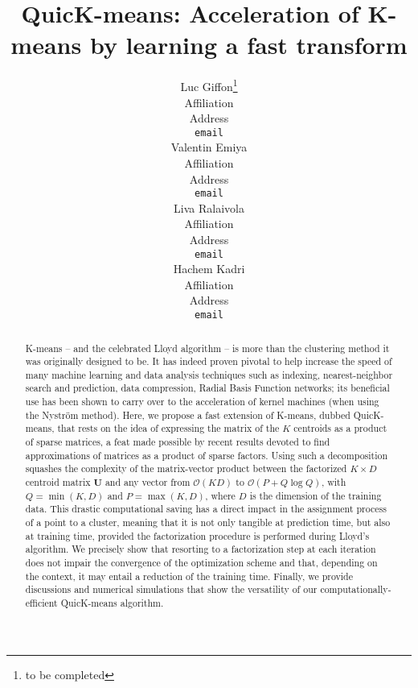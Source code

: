 \documentclass{article}
\title{QuicK-means: Acceleration of K-means by learning a fast transform}
\author{%
  Luc Giffon\thanks{to be completed} \\
  Affiliation\\
  Address\\
  \texttt{email} \\
   \And
   Valentin Emiya\\
  Affiliation\\
  Address\\
  \texttt{email} \\
   \And
   Liva Ralaivola\\
  Affiliation\\
  Address\\
  \texttt{email} \\
   \And
   Hachem Kadri\\
  Affiliation\\
  Address\\
  \texttt{email} \\
}
\begin{document}
\maketitle

\begin{abstract}
	
	K-means -- and the celebrated Lloyd algorithm -- is more than the clustering method it was originally designed to be. 
	It has indeed proven pivotal to help increase the speed of many machine learning and data analysis techniques such as indexing, nearest-neighbor search and prediction, data compression, Radial Basis Function networks; its beneficial use has been shown to carry over to the acceleration of kernel machines (when using the Nyström method). 
	Here, we propose a fast extension of K-means, dubbed QuicK-means, that rests on the idea of expressing the matrix of the $K$ centroids as a product of sparse matrices, a feat made possible by recent results devoted to find approximations of matrices as a product of sparse factors. Using such a decomposition squashes the complexity of the matrix-vector product between the factorized $K \times D$ centroid matrix $\mathbf{U}$ and any vector from $\mathcal{O}(KD)$ to $\mathcal{O}(P+Q \log Q)$, with $Q=\min (K, D)$ and $P=\max (K, D)$, where $D$ is the dimension of the training data. This drastic computational saving has a direct impact in the assignment process of a point to a cluster, meaning that it is not only tangible at prediction time, but also at training time, provided the factorization procedure is performed during Lloyd's algorithm. We precisely show that resorting to a factorization step at each iteration does not impair the convergence of the optimization scheme and that, depending on the context, it may entail a reduction of the training time. Finally, we provide discussions and numerical simulations that show the versatility of our computationally-efficient QuicK-means algorithm. 
	

\end{abstract}
\end{document}
